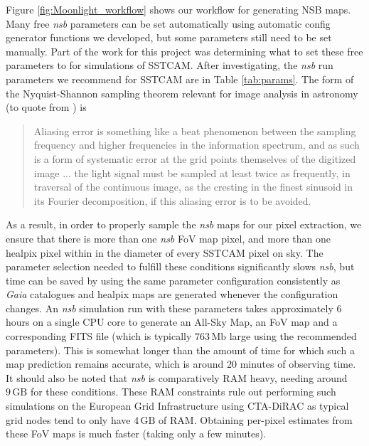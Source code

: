 Figure \ref{fig:Moonlight_workflow} shows our workflow for generating NSB maps. Many free \textit{nsb} parameters can be set automatically using automatic config generator functions we developed, but some parameters still need to be set manually. Part of the work for this project was determining what to set these free parameters to for simulations of SSTCAM. After investigating, the \textit{nsb} run parameters we recommend for SSTCAM are in Table \ref{tab:params}. The form of the Nyquist-Shannon sampling theorem relevant for image analysis in astronomy (to quote from \cite{nyquist}) is 
\begin{quote}
Aliasing error is something like a beat phenomenon between the sampling frequency and higher frequencies in the information spectrum, and as such is a form of systematic error at the grid points themselves of the digitized image ... the light signal must be sampled at least twice as frequently, in traversal of the continuous image, as the cresting in the finest sinusoid in its Fourier decomposition, if this aliasing error is to be avoided.
\end{quote}
As a result, in order to properly sample the \textit{nsb} maps for our pixel extraction, we ensure that there is more than one \textit{nsb} FoV map pixel, and more than one healpix pixel within in the diameter of every SSTCAM pixel on sky. The parameter selection needed to fulfill these conditions significantly slows \textit{nsb}, but time can be saved by using the same parameter configuration consistently as \textit{Gaia} catalogues and healpix maps are generated whenever the configuration changes. An \textit{nsb} simulation run with these parameters takes approximately 6 hours on a single CPU core to generate an All-Sky Map, an FoV map and a corresponding FITS file (which is typically $\mathrm{763\,Mb}$ large using the recommended parameters). This is somewhat longer than the amount of time for which such a map prediction remains accurate, which is around 20 minutes of observing time. It should also be noted that \textit{nsb} is comparatively RAM heavy, needing around $\mathrm{9\,GB}$ for these conditions. These RAM constraints rule out performing such simulations on the European Grid Infrastructure using CTA-DiRAC as typical grid nodes tend to only have $\mathrm{4\,GB}$ of RAM. Obtaining per-pixel estimates from these FoV maps is much faster (taking only a few minutes).

